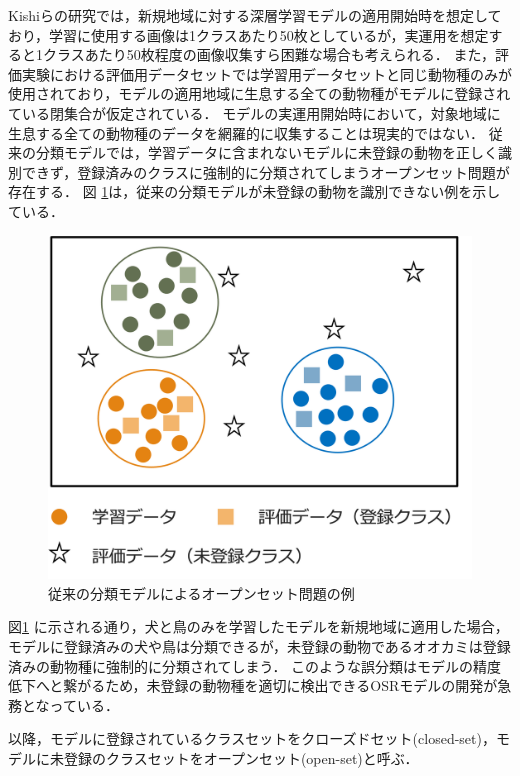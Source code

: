\documentclass[a4paper,11pt,nomag]{jsreport}
\begin{document}
Kishiらの研究では，新規地域に対する深層学習モデルの適用開始時を想定しており，学習に使用する画像は1クラスあたり50枚としているが，実運用を想定すると1クラスあたり50枚程度の画像収集すら困難な場合も考えられる．
また，評価実験における評価用データセットでは学習用データセットと同じ動物種のみが使用されており，モデルの適用地域に生息する全ての動物種がモデルに登録されている閉集合が仮定されている．
モデルの実運用開始時において，対象地域に生息する全ての動物種のデータを網羅的に収集することは現実的ではない．
従来の分類モデルでは，学習データに含まれないモデルに未登録の動物を正しく識別できず，登録済みのクラスに強制的に分類されてしまうオープンセット問題が存在する．
図 \ref{fig:non_osr}は，従来の分類モデルが未登録の動物を識別できない例を示している．

\begin{figure}[tbp]
  \centering
  \includegraphics[width=\linewidth, keepaspectratio]{image/osr.png}
  \caption{従来の分類モデルによるオープンセット問題の例}
  \label{fig:non_osr}
\end{figure}

図\ref{fig:non_osr} に示される通り，犬と鳥のみを学習したモデルを新規地域に適用した場合，モデルに登録済みの犬や鳥は分類できるが，未登録の動物であるオオカミは登録済みの動物種に強制的に分類されてしまう．
このような誤分類はモデルの精度低下へと繋がるため，未登録の動物種を適切に検出できるOSRモデルの開発が急務となっている．

以降，モデルに登録されているクラスセットをクローズドセット(closed-set)，モデルに未登録のクラスセットをオープンセット(open-set)と呼ぶ．



\end{document}
